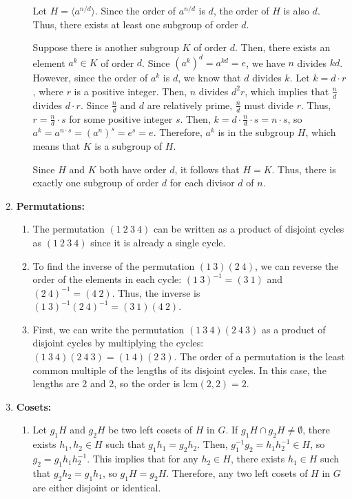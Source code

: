 \begin{enumerate}
\begin{enumerate}
    Let $H = \langle a^{n/d} \rangle$. Since the order of $a^{n/d}$ is $d$, the order of $H$ is also $d$. Thus, there exists at least one subgroup of order $d$.

    Suppose there is another subgroup $K$ of order $d$. Then, there exists an element $a^k \in K$ of order $d$. Since $(a^k)^d = a^{kd} = e$, we have $n$ divides $kd$. However, since the order of $a^k$ is $d$, we know that $d$ divides $k$. Let $k = d \cdot r$, where $r$ is a positive integer. Then, $n$ divides $d^2 r$, which implies that $\frac{n}{d}$ divides $d \cdot r$. Since $\frac{n}{d}$ and $d$ are relatively prime, $\frac{n}{d}$ must divide $r$. Thus, $r = \frac{n}{d} \cdot s$ for some positive integer $s$. Then, $k = d \cdot \frac{n}{d} \cdot s = n \cdot s$, so $a^k = a^{n \cdot s} = (a^n)^s = e^s = e$. Therefore, $a^k$ is in the subgroup $H$, which means that $K$ is a subgroup of $H$.

    
    Since $H$ and $K$ both have order $d$, it follows that $H = K$. Thus, there is exactly one subgroup of order $d$ for each divisor $d$ of $n$.
  \end{enumerate}

  \item \textbf{Permutations:}
  \begin{enumerate}
    \item The permutation $(1\ 2\ 3\ 4)$ can be written as a product of disjoint cycles as $(1\ 2\ 3\ 4)$ since it is already a single cycle.
    
    \item To find the inverse of the permutation $(1\ 3)(2\ 4)$, we can reverse the order of the elements in each cycle: $(1\ 3)^{-1} = (3\ 1)$ and $(2\ 4)^{-1} = (4\ 2)$. Thus, the inverse is $(1\ 3)^{-1}(2\ 4)^{-1} = (3\ 1)(4\ 2)$.
    
    \item First, we can write the permutation $(1\ 3\ 4)(2\ 4\ 3)$ as a product of disjoint cycles by multiplying the cycles: $(1\ 3\ 4)(2\ 4\ 3) = (1\ 4)(2\ 3)$. The order of a permutation is the least common multiple of the lengths of its disjoint cycles. In this case, the lengths are 2 and 2, so the order is $\text{lcm}(2, 2) = 2$.
  \end{enumerate}

  \item \textbf{Cosets:}
  \begin{enumerate}
    \item Let $g_1H$ and $g_2H$ be two left cosets of $H$ in $G$. If $g_1H \cap g_2H \neq \emptyset$, there exists $h_1, h_2 \in H$ such that $g_1h_1 = g_2h_2$. Then, $g_1^{-1}g_2 = h_1h_2^{-1} \in H$, so $g_2 = g_1h_1h_2^{-1}$. This implies that for any $h_2 \in H$, there exists $h_1 \in H$ such that $g_2h_2 = g_1h_1$, so $g_1H = g_2H$. Therefore, any two left cosets of $H$ in     $G$ are either disjoint or identical.


\end{enumerate}
\end{enumerate}
